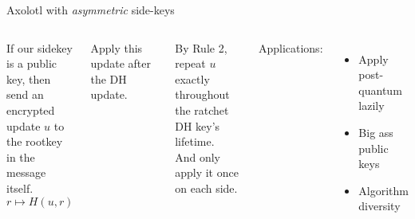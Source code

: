 \documentclass[fleqn,xcolor={usenames,dvipsnames}]{beamer}
\begin{document}
\begin{frame}{Axolotl with {\em asymmetric} side-keys}
\begin{columns}[T]
If our sidekey is a public key, then  \\
\hspace*{2pt} send an encrypted update $u$ to \\
\hspace*{2pt} the rootkey in the message itself. %
$$r \mapsto H(u,r)$$

Apply this update after the DH update.

By Rule 2, repeat $u$ exactly throughout\\
\hspace*{2pt} the ratchet DH key's lifetime. \\
And only apply it once on each side.

\bigskip
Applications:
\begin{itemize}
\item Apply post-quantum lazily 
\item Big ass public keys
\item Algorithm diversity
\end{itemize}


\end{columns}
\end{frame}
\end{document}
